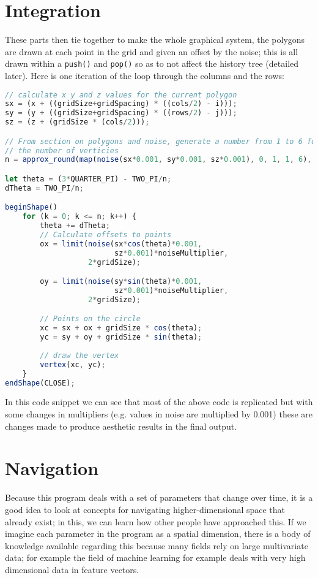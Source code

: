 \section{Integration}
These parts then tie together to make the whole graphical system, the polygons
are drawn at each point in the grid and given an offset by the noise; this is
all drawn within a \verb|push()| and \verb|pop()| so as to not affect the
history tree (detailed later). Here is one iteration of the loop through the
columns and the rows:

\begin{lstlisting}[language=JavaScript]
// calculate x y and z values for the current polygon
sx = (x + ((gridSize+gridSpacing) * ((cols/2) - i)));
sy = (y + ((gridSize+gridSpacing) * ((rows/2) - j)));
sz = (z + (gridSize * (cols/2)));

// From section on polygons and noise, generate a number from 1 to 6 for
// the number of verticies
n = approx_round(map(noise(sx*0.001, sy*0.001, sz*0.001), 0, 1, 1, 6), 1);

let theta = (3*QUARTER_PI) - TWO_PI/n;
dTheta = TWO_PI/n;

beginShape()
    for (k = 0; k <= n; k++) {
        theta += dTheta;
        // Calculate offsets to points
        ox = limit(noise(sx*cos(theta)*0.001, 
                         sz*0.001)*noiseMultiplier, 
                   2*gridSize);

        oy = limit(noise(sy*sin(theta)*0.001, 
                         sz*0.001)*noiseMultiplier, 
                   2*gridSize);

        // Points on the circle
        xc = sx + ox + gridSize * cos(theta);
        yc = sy + oy + gridSize * sin(theta);
        
        // draw the vertex
        vertex(xc, yc);
    }
endShape(CLOSE);
\end{lstlisting}

In this code snippet we can see that most of the above code is replicated but
with some changes in multipliers (e.g. values in noise are multiplied by 0.001)
these are changes made to produce aesthetic results in the final output.

\section{Navigation}
Because this program deals with a set of parameters that change over time, it is
a good idea to look at concepts for navigating higher-dimensional space that
already exist; in this, we can learn how other people have approached this. If we
imagine each parameter in the program as a spatial dimension, there is a body of
knowledge available regarding this because many fields rely on large
multivariate data; for example the field of machine learning for example deals
with very high dimensional data in feature vectors.

